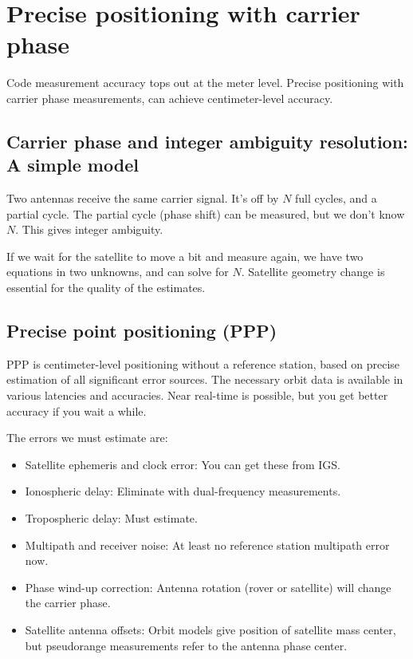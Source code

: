 \section{Precise positioning with carrier phase}
Code measurement accuracy tops out at the meter level. Precise positioning with carrier phase measurements, can achieve centimeter-level accuracy.

\subsection{Carrier phase and integer ambiguity resolution: A simple model}
Two antennas receive the same carrier signal. It's off by $N$ full cycles, and a partial cycle. The partial cycle (phase shift) can be measured, but we don't know $N$. This gives integer ambiguity.

If we wait for the satellite to move a bit and measure again, we have two equations in two unknowns, and can solve for $N$. Satellite geometry change is essential for the quality of the estimates.

\subsection{Precise point positioning (PPP)}

PPP is centimeter-level positioning without a reference station, based on precise estimation of all significant error sources. The necessary orbit data is available in various latencies and accuracies. Near real-time is possible, but you get better accuracy if you wait a while.

The errors we must estimate are:
\begin{itemize}
    \item Satellite ephemeris and clock error: You can get these from IGS.
    \item Ionospheric delay: Eliminate with dual-frequency measurements.
    \item Tropospheric delay: Must estimate.
    \item Multipath and receiver noise: At least no reference station multipath error now.
    \item Phase wind-up correction: Antenna rotation (rover or satellite) will change the carrier phase.
    \item Satellite antenna offsets: Orbit models give position of satellite mass center, but pseudorange measurements refer to the antenna phase center.
\end{itemize}

